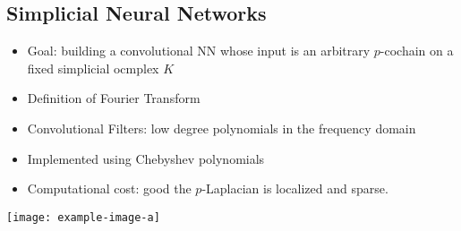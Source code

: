 \subsection{Simplicial Neural Networks}
\begin{itemize}
\item Goal: building a convolutional NN whose input is an arbitrary $p$-cochain on a fixed simplicial ocmplex $K$
\item  Definition of Fourier Transform
\item Convolutional Filters: low degree polynomials in the frequency domain
\item Implemented using Chebyshev polynomials
\item Computational cost: good the $p$-Laplacian is localized and sparse.
\end{itemize}

\texttt{[image: example-image-a]}